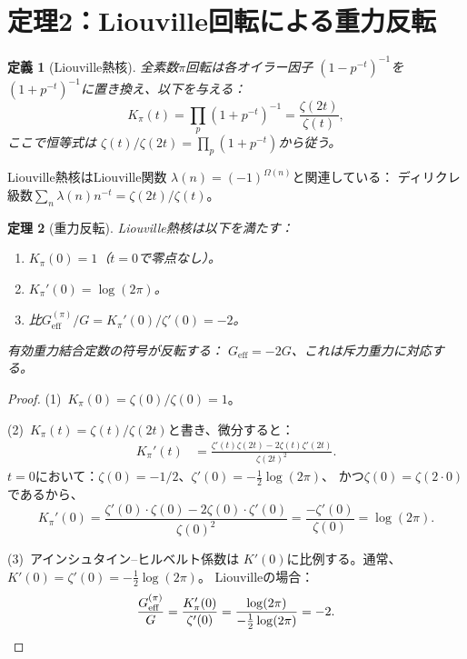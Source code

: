 \documentclass[a4paper,11pt]{article}
\newtheorem{theorem}{定理}
\newtheorem{definition}[theorem]{定義}
\begin{document}
\section{定理2：Liouville回転による重力反転}
\label{sec:reversal}

\begin{definition}[Liouville熱核]
全素数$\pi$回転は各オイラー因子
$(1 - p^{-t})^{-1}$を$(1 + p^{-t})^{-1}$に置き換え、以下を与える：
\begin{equation}
  K_\pi(t) = \prod_p(1 + p^{-t})^{-1} = \frac{\zeta(2t)}{\zeta(t)},
  \label{eq:liouville}
\end{equation}
ここで恒等式は
$\zeta(t)/\zeta(2t) = \prod_p(1 + p^{-t})$から従う。
\end{definition}

Liouville熱核はLiouville関数
$\lambda(n) = (-1)^{\Omega(n)}$と関連している：
ディリクレ級数$\sum_n \lambda(n) n^{-t} = \zeta(2t)/\zeta(t)$。

\begin{theorem}[重力反転]
\label{thm:reversal}
Liouville熱核は以下を満たす：
\begin{enumerate}
\item $K_\pi(0) = 1$（$t = 0$で零点なし）。
\item $K_\pi'(0) = \log(2\pi)$。
\item 比$G_{\mathrm{eff}}^{(\pi)} / G = K_\pi'(0) / \zeta'(0) = -2$。
\end{enumerate}
有効重力結合定数の符号が反転する：
$G_{\mathrm{eff}} = -2G$、これは斥力重力に対応する。
\end{theorem}

\begin{proof}
(1)~$K_\pi(0) = \zeta(0)/\zeta(0) = 1$。

\noindent(2)~$K_\pi(t) = \zeta(t)/\zeta(2t)$と書き、微分すると：
\begin{align}
  K_\pi'(t) &= \frac{\zeta'(t)\zeta(2t) - 2\zeta(t)\zeta'(2t)}{\zeta(2t)^2}.
\end{align}
$t = 0$において：$\zeta(0) = -1/2$、$\zeta'(0) = -\tfrac{1}{2}\log(2\pi)$、
かつ$\zeta(0) = \zeta(2 \cdot 0)$であるから、
\begin{equation}
  K_\pi'(0) = \frac{\zeta'(0) \cdot \zeta(0) - 2\zeta(0)\cdot\zeta'(0)}
  {\zeta(0)^2} = \frac{-\zeta'(0)}{\zeta(0)} = \log(2\pi).
\end{equation}

\noindent(3)~アインシュタイン--ヒルベルト係数は
$K'(0)$に比例する。通常、$K'(0) = \zeta'(0) = -\tfrac{1}{2}\log(2\pi)$。
Liouvilleの場合：
\begin{equation}
  \frac{G_{\mathrm{eff}}^{(\pi)}}{G}
  = \frac{K_\pi'(0)}{\zeta'(0)}
  = \frac{\log(2\pi)}{-\tfrac{1}{2}\log(2\pi)}
  = -2. \qedhere
\end{equation}
\end{proof}
\end{document}
